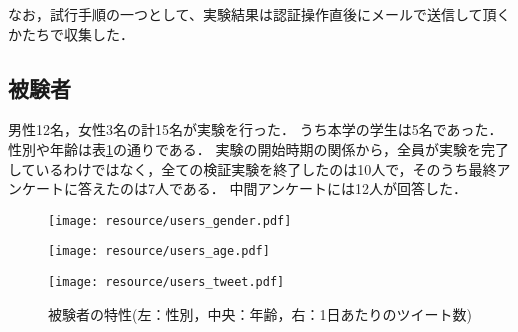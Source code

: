 なお，試行手順の一つとして、実験結果は認証操作直後にメールで送信して頂くかたちで収集した．

\subsection{被験者}
男性12名，女性3名の計15名が実験を行った．
うち本学の学生は5名であった．
性別や年齢は表\ref{fig:participants}の通りである．
実験の開始時期の関係から，全員が実験を完了しているわけではなく，全ての検証実験を終了したのは10人で，そのうち最終アンケートに答えたのは7人である．
中間アンケートには12人が回答した．

\begin{figure}[ht]
  \begin{minipage}{0.32\hsize}
    \begin{center}
      \texttt{[image: resource/users\_gender.pdf]}
    \end{center}
  \end{minipage}
  \begin{minipage}{0.32\hsize}
    \begin{center}
      \texttt{[image: resource/users\_age.pdf]}
    \end{center}
  \end{minipage}
  \begin{minipage}{0.32\hsize}
    \begin{center}
      \texttt{[image: resource/users\_tweet.pdf]}
    \end{center}
  \end{minipage}
  \caption{被験者の特性(左：性別，中央：年齢，右：1日あたりのツイート数)}
  \label{fig:participants}
\end{figure}

